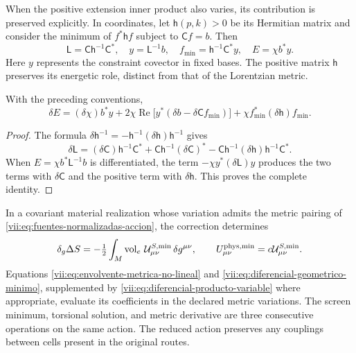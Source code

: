 When the positive extension inner product also varies, its
contribution is preserved explicitly. In coordinates, let
\(\mathsf h(p,k)>0\) be its Hermitian matrix and consider the minimum
of \(f^*\mathsf h f\) subject to \(\mathsf C f=b\). Then
\begin{equation}
 \mathsf L=\mathsf C\mathsf h^{-1}\mathsf C^*,\quad
 y=\mathsf L^{-1}b,\quad
 f_{\min}=\mathsf h^{-1}\mathsf C^*y,\quad
 E=\chi b^*y.
 \label{vii:eq:minimo-producto-variable}
\end{equation}
Here \(y\) represents the constraint covector in fixed
bases. The positive matrix \(\mathsf h\) preserves its energetic
role, distinct from that of the Lorentzian metric.

\begin{lemma}
\label{vii:lem:producto-variable-extension}
With the preceding conventions,
\begin{equation}
 \delta E=(\delta\chi)b^*y
   +2\chi\operatorname{Re}\bigl[y^*(\delta b-\delta\mathsf C f_{\min})\bigr]
   +\chi f_{\min}^*(\delta\mathsf h)f_{\min}.
 \label{vii:eq:diferencial-producto-variable}
\end{equation}
\end{lemma}
\begin{proof}
The formula \(\delta\mathsf h^{-1}
=-\mathsf h^{-1}(\delta\mathsf h)\mathsf h^{-1}\) gives
\[
 \delta\mathsf L=(\delta\mathsf C)\mathsf h^{-1}\mathsf C^*
 +\mathsf C\mathsf h^{-1}(\delta\mathsf C)^*
 -\mathsf C\mathsf h^{-1}(\delta\mathsf h)
                              \mathsf h^{-1}\mathsf C^*.
\]
When \(E=\chi b^*\mathsf L^{-1}b\) is differentiated, the term
\(-\chi y^*(\delta\mathsf L)y\) produces the two terms
with \(\delta\mathsf C\) and the positive term with
\(\delta\mathsf h\). This proves the complete identity.
\end{proof}

In a covariant material realization whose variation admits the
metric pairing of
\eqref{vii:eq:fuentes-normalizadas-accion}, the correction determines
\begin{equation}
 \delta_g\Delta S
 =-\tfrac12\int_M\operatorname{vol}_e\,
          \mathcal U^{S,\min}_{\mu\nu}\,\delta g^{\mu\nu},
 \qquad U^{\rm phys,\min}_{\mu\nu}
                      =c\mathcal U^{S,\min}_{\mu\nu}.
 \label{vii:eq:fuente-metrica-minimo-no-lineal}
\end{equation}
Equations \eqref{vii:eq:envolvente-metrica-no-lineal} and
\eqref{vii:eq:diferencial-geometrico-minimo}, supplemented by
\eqref{vii:eq:diferencial-producto-variable} where appropriate,
evaluate its coefficients in the declared metric variations.
The screen minimum, torsional solution, and metric derivative
are three consecutive operations on the same action.
The reduced action preserves any couplings between
cells present in the original routes.

